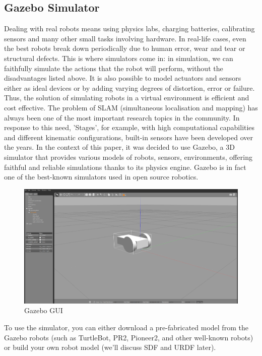  \subsection{Gazebo Simulator}
Dealing with real robots means using physics labs, charging batteries, calibrating sensors and many other small tasks involving hardware.
In real-life cases, even the best robots break down periodically due to human error, wear and tear or structural defects.  This is where simulators come in: in simulation, we can faithfully simulate the actions that the robot will perform, without the disadvantages listed above.
It is also possible to model actuators and sensors either as ideal devices or by adding varying degrees of distortion, error or failure. Thus, the solution of simulating robots in a virtual environment is efficient and cost effective.
The problem of SLAM (simultaneous localisation and mapping) has always been one of the most important research topics in the community.
In response to this need, 'Stages', for example, with high computational capabilities and different kinematic configurations, built-in sensors have been developed over the years.
In the context of this paper, it was decided to use Gazebo, a 3D simulator that provides various models of robots, sensors, environments, offering faithful and reliable simulations thanks to its physics engine. Gazebo is in fact one of the best-known simulators used in open source robotics.
 \begin{figure}[H]
     \centering
     \includegraphics[scale=0.25]{Images/Chapter 2/gazebogui.png}
     \caption{Gazebo GUI}
     \label{fig:gazebogui}
 \end{figure}
To use the simulator, you can either download a pre-fabricated model from the Gazebo robots (such as TurtleBot, PR2, Pioneer2, and other well-known robots) or build your own robot model (we'll discuss SDF and URDF later).
